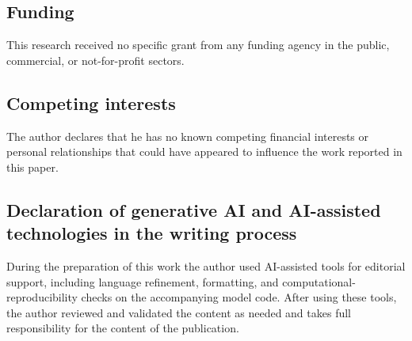 \documentclass[11pt]{article}
\begin{document}
\subsection*{Funding}
This research received no specific grant from any funding agency in the public, commercial, or not-for-profit sectors.

\subsection*{Competing interests}
The author declares that he has no known competing financial interests or personal relationships that could have appeared to influence the work reported in this paper.

\subsection*{Declaration of generative AI and AI-assisted technologies in the writing process}
During the preparation of this work the author used AI-assisted tools for editorial support, including language refinement, formatting, and computational-reproducibility checks on the accompanying model code. After using these tools, the author reviewed and validated the content as needed and takes full responsibility for the content of the publication.
\end{document}
